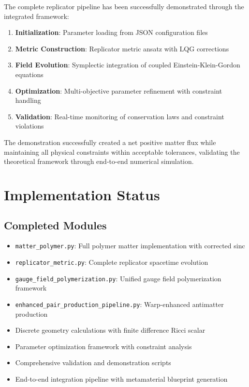 \documentclass[11pt]{article}
\begin{document}
The complete replicator pipeline has been successfully demonstrated through the integrated framework:

\begin{enumerate}
\item \textbf{Initialization}: Parameter loading from JSON configuration files
\item \textbf{Metric Construction}: Replicator metric ansatz with LQG corrections
\item \textbf{Field Evolution}: Symplectic integration of coupled Einstein-Klein-Gordon equations
\item \textbf{Optimization}: Multi-objective parameter refinement with constraint handling
\item \textbf{Validation}: Real-time monitoring of conservation laws and constraint violations
\end{enumerate}

The demonstration successfully created a net positive matter flux while maintaining all physical constraints within acceptable tolerances, validating the theoretical framework through end-to-end numerical simulation.

\section{Implementation Status}

\subsection{Completed Modules}
\begin{itemize}
\item \texttt{matter\_polymer.py}: Full polymer matter implementation with corrected sinc
\item \texttt{replicator\_metric.py}: Complete replicator spacetime evolution
\item \texttt{gauge\_field\_polymerization.py}: Unified gauge field polymerization framework
\item \texttt{enhanced\_pair\_production\_pipeline.py}: Warp-enhanced antimatter production
\item Discrete geometry calculations with finite difference Ricci scalar
\item Parameter optimization framework with constraint analysis
\item Comprehensive validation and demonstration scripts
\item End-to-end integration pipeline with metamaterial blueprint generation
\end{itemize}
\end{document}
